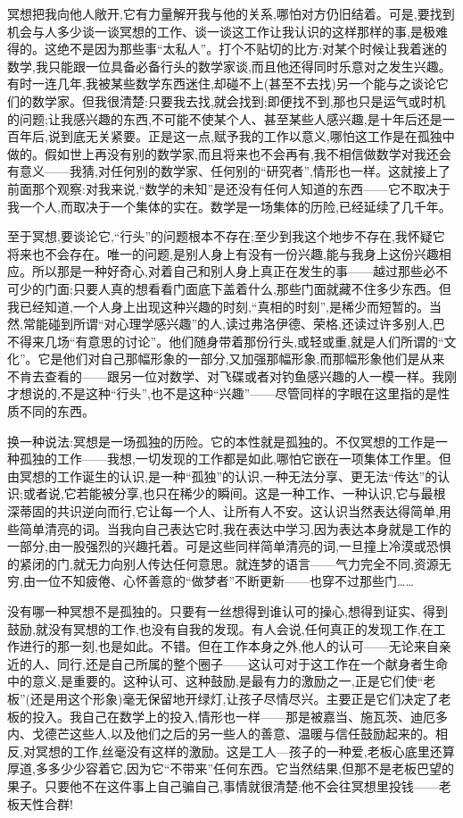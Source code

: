  冥想把我向他人敞开,它有力量解开我与他的关系,哪怕对方仍旧结着。可是,要找到机会与人多少谈一谈冥想的工作、谈一谈这工作让我认识的这样那样的事,是极难得的。这绝不是因为那些事“太私人”。打个不贴切的比方:对某个时候让我着迷的数学,我只能跟一位具备必备行头的数学家谈,而且他还得同时乐意对之发生兴趣。有时一连几年,我被某些数学东西迷住,却碰不上(甚至不去找)另一个能与之谈论它们的数学家。但我很清楚:只要我去找,就会找到;即便找不到,那也只是运气或时机的问题;让我感兴趣的东西,不可能不使某个人、甚至某些人感兴趣,是十年后还是一百年后,说到底无关紧要。正是这一点,赋予我的工作以意义,哪怕这工作是在孤独中做的。假如世上再没有别的数学家,而且将来也不会再有,我不相信做数学对我还会有意义——我猜,对任何别的数学家、任何别的“研究者”,情形也一样。这就接上了前面那个观察:对我来说,“数学的未知”是还没有任何人知道的东西——它不取决于我一个人,而取决于一个集体的实在。数学是一场集体的历险,已经延续了几千年。

 至于冥想,要谈论它,“行头”的问题根本不存在;至少到我这个地步不存在,我怀疑它将来也不会存在。唯一的问题,是别人身上有没有一份兴趣,能与我身上这份兴趣相应。所以那是一种好奇心,对着自己和别人身上真正在发生的事——越过那些必不可少的门面;只要人真的想看看门面底下盖着什么,那些门面就藏不住多少东西。但我已经知道,一个人身上出现这种兴趣的时刻,“真相的时刻”,是稀少而短暂的。当然,常能碰到所谓“对心理学感兴趣”的人,读过弗洛伊德、荣格,还读过许多别人,巴不得来几场“有意思的讨论”。他们随身带着那份行头,或轻或重,就是人们所谓的“文化”。它是他们对自己那幅形象的一部分,又加强那幅形象,而那幅形象他们是从来不肯去查看的——跟另一位对数学、对飞碟或者对钓鱼感兴趣的人一模一样。我刚才想说的,不是这种“行头”,也不是这种“兴趣”——尽管同样的字眼在这里指的是性质不同的东西。

 换一种说法:冥想是一场孤独的历险。它的本性就是孤独的。不仅冥想的工作是一种孤独的工作——我想,一切发现的工作都是如此,哪怕它嵌在一项集体工作里。但由冥想的工作诞生的认识,是一种“孤独”的认识,一种无法分享、更无法“传达”的认识;或者说,它若能被分享,也只在稀少的瞬间。这是一种工作、一种认识,它与最根深蒂固的共识逆向而行,它让每一个人、让所有人不安。这认识当然表达得简单,用些简单清亮的词。当我向自己表达它时,我在表达中学习,因为表达本身就是工作的一部分,由一股强烈的兴趣托着。可是这些同样简单清亮的词,一旦撞上冷漠或恐惧的紧闭的门,就无力向别人传达任何意思。就连梦的语言——气力完全不同,资源无穷,由一位不知疲倦、心怀善意的“做梦者”不断更新——也穿不过那些门……

没有哪一种冥想不是孤独的。只要有一丝想得到谁认可的操心,想得到证实、得到鼓励,就没有冥想的工作,也没有自我的发现。有人会说,任何真正的发现工作,在工作进行的那一刻,也是如此。不错。但在工作本身之外,他人的认可——无论来自亲近的人、同行,还是自己所属的整个圈子——这认可对于这工作在一个献身者生命中的意义,是重要的。这种认可、这种鼓励,是最有力的激励之一,正是它们使“老板”(还是用这个形象)毫无保留地开绿灯,让孩子尽情尽兴。主要正是它们决定了老板的投入。我自己在数学上的投入,情形也一样——那是被嘉当、施瓦茨、迪厄多内、戈德芒这些人,以及他们之后的另一些人的善意、温暖与信任鼓励起来的。相反,对冥想的工作,丝毫没有这样的激励。这是工人—孩子的一种爱,老板心底里还算厚道,多多少少容着它,因为它“不带来”任何东西。它当然结果,但那不是老板巴望的果子。只要他不在这件事上自己骗自己,事情就很清楚:他不会往冥想里投钱——老板天性合群!

